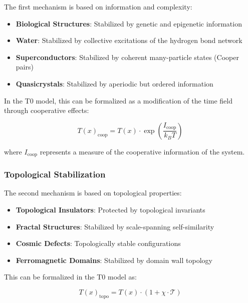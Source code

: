 \documentclass[12pt,a4paper]{article}
\newcommand{\Tfield}{T(x)}
\begin{document}
	The first mechanism is based on information and complexity:
	
	\begin{itemize}
		\item \textbf{Biological Structures}: Stabilized by genetic and epigenetic information
		\item \textbf{Water}: Stabilized by collective excitations of the hydrogen bond network
		\item \textbf{Superconductors}: Stabilized by coherent many-particle states (Cooper pairs)
		\item \textbf{Quasicrystals}: Stabilized by aperiodic but ordered information
	\end{itemize}
	
	In the T0 model, this can be formalized as a modification of the time field through cooperative effects:
	
	\begin{equation}
		\Tfield_{\text{coop}} = \Tfield \cdot \exp\left(\frac{I_{\text{coop}}}{k_B T}\right)
	\end{equation}
	
	where $I_{\text{coop}}$ represents a measure of the cooperative information of the system.
	
	\subsubsection{Topological Stabilization}
	\label{subsubsec:topo_stabilisierung}
	
	The second mechanism is based on topological properties:
	
	\begin{itemize}
		\item \textbf{Topological Insulators}: Protected by topological invariants
		\item \textbf{Fractal Structures}: Stabilized by scale-spanning self-similarity
		\item \textbf{Cosmic Defects}: Topologically stable configurations
		\item \textbf{Ferromagnetic Domains}: Stabilized by domain wall topology
	\end{itemize}
	
	This can be formalized in the T0 model as:
	
	\begin{equation}
		\Tfield_{\text{topo}} = \Tfield \cdot (1 + \chi \cdot \mathcal{T})
	\end{equation}
	
\end{document}
